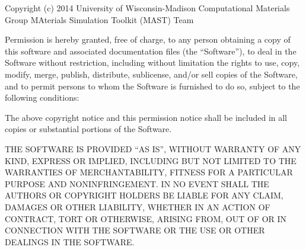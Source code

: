 \documentclass[letterpaper,10pt,english]{sphinxmanual}
\begin{document}
Copyright (c) 2014 University of Wisconsin-Madison Computational Materials Group MAterials Simulation Toolkit (MAST) Team

Permission is hereby granted, free of charge, to any person obtaining a copy
of this software and associated documentation files (the ``Software''), to deal
in the Software without restriction, including without limitation the rights
to use, copy, modify, merge, publish, distribute, sublicense, and/or sell
copies of the Software, and to permit persons to whom the Software is
furnished to do so, subject to the following conditions:

The above copyright notice and this permission notice shall be included in
all copies or substantial portions of the Software.

THE SOFTWARE IS PROVIDED ``AS IS'', WITHOUT WARRANTY OF ANY KIND, EXPRESS OR
IMPLIED, INCLUDING BUT NOT LIMITED TO THE WARRANTIES OF MERCHANTABILITY,
FITNESS FOR A PARTICULAR PURPOSE AND NONINFRINGEMENT. IN NO EVENT SHALL THE
AUTHORS OR COPYRIGHT HOLDERS BE LIABLE FOR ANY CLAIM, DAMAGES OR OTHER
LIABILITY, WHETHER IN AN ACTION OF CONTRACT, TORT OR OTHERWISE, ARISING FROM,
OUT OF OR IN CONNECTION WITH THE SOFTWARE OR THE USE OR OTHER DEALINGS IN
THE SOFTWARE.



\renewcommand{\indexname}{Index}
\printindex
\end{document}
